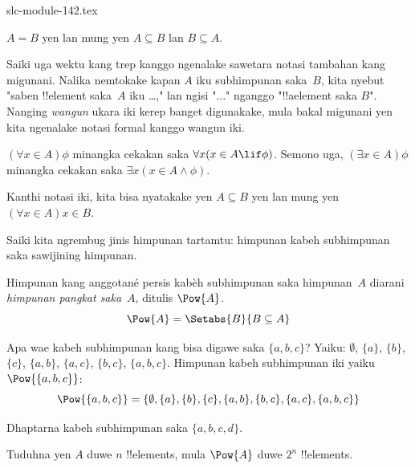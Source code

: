 \begin{filecontents*}[overwrite]{slc-module-142.tex}
\begin{prop}
$A = B$ yen lan mung yen $A \subseteq B$ lan $B \subseteq A$.
\end{prop}

Saiki uga wektu kang trep kanggo ngenalake sawetara notasi
tambahan kang migunani. Nalika nemtokake kapan $A$ iku subhimpunan
saka~$B$, kita nyebut "saben !!{element} saka~$A$ iku \dots,"
lan ngisi "$\dots$" nganggo "!!a{element} saka $B$".
Nanging \emph{wangun} ukara iki kerep banget digunakake, mula
bakal migunani yen kita ngenalake notasi formal kanggo wangun iki.

\begin{defn}
$(\forall x \in A)\phi$ minangka cekakan saka $\forall x(x \in A \lif
\phi)$. Semono uga, $(\exists x \in A)\phi$ minangka cekakan saka
$\exists x(x\in A \land \phi)$.
\end{defn}

Kanthi notasi iki, kita bisa nyatakake yen $A \subseteq B$ yen lan
mung yen $(\forall x \in A)x \in B$.

Saiki kita ngrembug jinis himpunan tartamtu: himpunan kabeh
subhimpunan saka sawijining himpunan.

\begin{defn}
Himpunan kang anggotané persis kabèh subhimpunan saka himpunan~$A$ diarani
\emph{himpunan pangkat saka}~$A$, ditulis $\Pow{A}$.
  \[
    \Pow{A} = \Setabs{B}{B \subseteq A}
  \]
\end{defn}

\begin{ex}
Apa wae kabeh subhimpunan kang bisa digawe saka $\{ a, b, c \}$?
Yaiku: $\emptyset$, $\{a \}$, $\{b\}$, $\{c\}$, $\{a, b\}$,
$\{a, c\}$, $\{b,c\}$, $\{a, b, c\}$.
Himpunan kabeh subhimpunan iki yaiku $\Pow{\{a,b,c\}}$:
\[
\Pow{\{ a, b, c \}} = \{\emptyset, \{a \}, \{b\}, \{c\}, \{a, b\},
\{b, c\}, \{a, c\}, \{a, b, c\}\}
\]
\end{ex}

\begin{prob}
Dhaptarna kabeh subhimpunan saka $\{a, b, c, d\}$.
\end{prob}

\begin{prob}
Tuduhna yen $A$ duwe $n$ !!{element}s, mula $\Pow{A}$ duwe
$2^n$ !!{element}s.
\end{prob}


\end{filecontents*}

